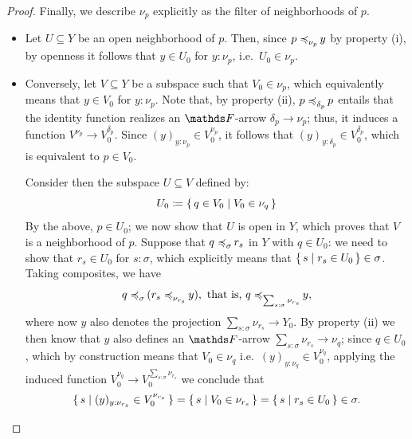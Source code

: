 \begin{prop}
\begin{proof}
Finally, we describe $\nu_p$ explicitly as the filter of neighborhoods of $p$.
    \begin{itemize}
        \item Let $U \subseteq Y$ be an open neighborhood of $p$. Then, since $p \mathrel{\preccurlyeq_{{\nu_p}}^{{}}\mkern-2mu} y$ by property (i), by openness it follows that $y \in U_0$ for $y:\nu_p$, i.e.\ $U_0 \in \nu_p$.
        \item Conversely, let $V \subseteq Y$ be a subspace such that $V_0 \in \nu_p$, which equivalently means that $y \in V_0$ for $y: \nu_p$. Note that, by property (ii), $p \mathrel{\preccurlyeq_{{\delta_p}}^{{}}\mkern-2mu} p$ entails that the identity function realizes an $\FF$-arrow $\delta_p \to \nu_p$; thus, it induces a function $V^{\nu_p} \to V_0^{\delta_p}$. Since $(y)_{y:\nu_p} \in V_0^{\nu_p}$, it follows that $(y)_{y:\delta_p} \in V_0^{\delta_p}$, which is equivalent to $p \in V_0$.
        
        Consider then the subspace $U \subseteq V$ defined by:
        \[ U_0 \coloneqq \set{ q \in V_0 | V_0 \in \nu_q } \]
        By the above, $p \in U_0$; we now show that $U$ is open in $Y$, which proves that $V$ is a neighborhood of $p$. Suppose that $q \mathrel{\preccurlyeq_{{\sigma}}^{{}}\mkern-2mu} r_s$ in $Y$ with $q \in U_0$: we need to show that $r_s \in U_0$ for $s:\sigma$, which explicitly means that $\set{ s | r_s \in U_0}\in \sigma$. Taking composites, we have 
        \[ q \mathrel{\preccurlyeq_{{\sigma}}^{{}}\mkern-2mu} (r_s \mathrel{\preccurlyeq_{{\nu_{r_s}}}^{{}}\mkern-2mu} y ), \mbox{ that is, }q \mathrel{\preccurlyeq_{{\sum_{s:\sigma}\nu_{r_s}}}^{{}}\mkern-2mu} y,\]
        where now $y$ also denotes the projection $\sum_{s:\sigma}\nu_{r_s} \to Y_0$.  By property (ii) we then know that $y$ also defines an $\FF$-arrow $\sum_{s:\sigma}\nu_{r_s} \to \nu_q$; since $q \in U_0$, which by construction means that $V_0\in \nu_q$ i.e.\ $(y)_{y:\nu_q} \in V^{\nu_q}_0$, applying the induced function $V_0^{\nu_q} \to V_0^{\sum_{s:\sigma} \nu_{r_s}}$ we conclude that 
        \[\set{ s | (y)_{y:\nu_{r_s}} \in V_0^{\nu_{r_s}} }  = \set{ s | V_0 \in \nu_{r_s}} = \set{ s | r_s \in U_0}\in \sigma.\]
    \end{itemize}  
\end{proof}
\end{prop}


